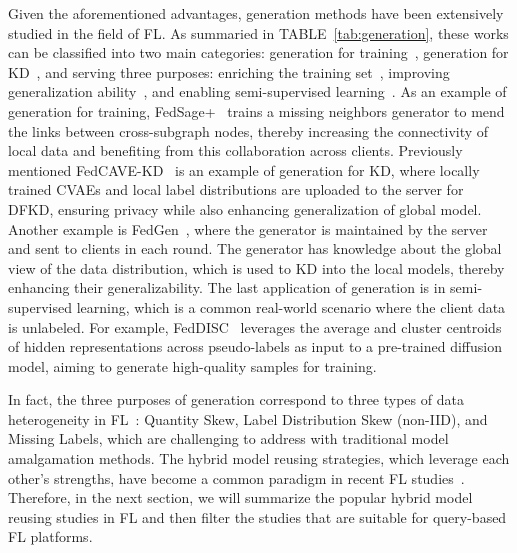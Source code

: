Given the aforementioned advantages, generation methods have been extensively studied in the field of FL. 
As summaried in TABLE~\ref{tab:generation}, these works can be classified into two main categories: generation for training~\cite{zhang2021subgraph, cheng2023gfl, hao2021towards, cha2019federated, yu2023turning, heinbaugh2023data, yang2023exploring, liu2021feddg, pi2023dynafed, liz2022federated, diao2022semifl}, generation for KD~\cite{zhang2022dense, chen2020fedbe, zhu2021data, zhang2022fine, jeong2018communication, jin2023feddyn, heinbaugh2023data, zhang2022fedzkt, fan2022private}, and serving three purposes: enriching the training set~\cite{zhang2022dense, chen2020fedbe, zhang2021subgraph, cheng2023gfl, cha2019federated, jin2023feddyn, zhang2022fedzkt}, improving generalization ability~\cite{zhu2021data, zhang2022fine, hao2021towards, jeong2018communication, yu2023turning, heinbaugh2023data, liu2021feddg, pi2023dynafed, liz2022federated}, and enabling semi-supervised learning~\cite{yang2023exploring, diao2022semifl, fan2022private}.
As an example of generation for training, FedSage+~\cite{zhang2021subgraph} trains a missing neighbors generator to mend the links between cross-subgraph nodes, thereby increasing the connectivity of local data and benefiting from this collaboration across clients.
Previously mentioned FedCAVE-KD~\cite{heinbaugh2023data} is an example of generation for KD, where locally trained CVAEs and local label distributions are uploaded to the server for DFKD, ensuring privacy while also enhancing generalization of global model.
Another example is FedGen~\cite{zhu2021data}, where the generator is maintained by the server and sent to clients in each round.
The generator has knowledge about the global view of the data distribution, which is used to KD into the local models, thereby enhancing their generalizability.
The last application of generation is in semi-supervised learning, which is a common real-world scenario where the client data is unlabeled.
For example, FedDISC~\cite{yang2023exploring} leverages the average and cluster centroids of hidden representations across pseudo-labels as input to a pre-trained diffusion model, aiming to generate high-quality samples for training.

In fact, the three purposes of generation correspond to three types of data heterogeneity in FL~\cite{liqb2022federated}: Quantity Skew, Label Distribution Skew (non-IID), and Missing Labels, which are challenging to address with traditional model amalgamation methods.
The hybrid model reusing strategies, which leverage each other's strengths, have become a common paradigm in recent FL studies~\cite{cheng2023gfl, xie2023perada, yu2023turning, jin2023feddyn, heinbaugh2023data, yang2023exploring, zhang2023navigating}.
Therefore, in the next section, we will summarize the popular hybrid model reusing studies in FL and then filter the studies that are suitable for query-based FL platforms.


